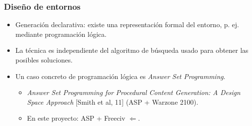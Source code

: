 \begin{frame}
\frametitle{Diseño de entornos}

	\begin{itemize}
		\item<1-> \textcolor{UDCpink}{Generación declarativa}: existe una representación formal del entorno, p. ej. mediante \textcolor{UDCpink}{programación lógica}.
		
		\vspace{1em}
		
		\item<2-> La técnica es \textcolor{UDCpink}{independiente} del algoritmo de búsqueda usado para obtener las posibles soluciones.
		
		\vspace{1em}
		
		\item<3-> Un caso concreto de programación lógica es \textcolor{UDCpink}{\textit{Answer Set Programming}}.
		
		\vspace{0.5em}
		
		\begin{itemize}
			\item<4-> \textit{Answer Set Programming for Procedural Content Generation: A Design Space Approach} \textcolor{UDCpink}{[Smith et al, 11]} (ASP + Warzone 2100).
			
			\vspace{0.5em}
			
			\item<5-> En este proyecto: \textcolor{UDCpink}{ASP + Freeciv} $\Leftarrow$.
		\end{itemize}
	\end{itemize}

\end{frame}